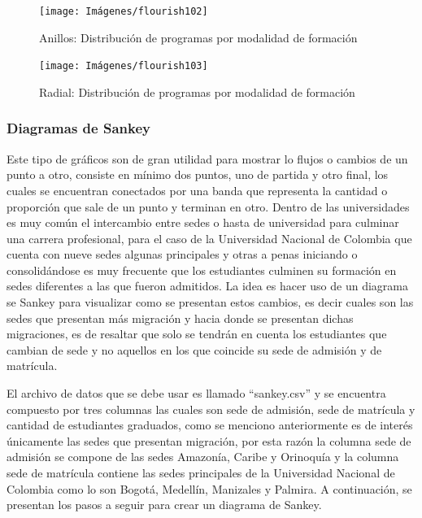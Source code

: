 \documentclass[
]{book}
\begin{document}
\begin{figure}

{\centering \texttt{[image: Imágenes/flourish102]} 

}

\caption{Anillos: Distribución de programas por modalidad de formación}\label{fig:anillosjerarquiaflourish-fig}
\end{figure}

\begin{figure}

{\centering \texttt{[image: Imágenes/flourish103]} 

}

\caption{Radial: Distribución de programas por modalidad de formación}\label{fig:radialjerarquiaflourish-fig}
\end{figure}

\hypertarget{diagramadesankeyflourish}{%
\subsubsection{Diagramas de Sankey}\label{diagramadesankeyflourish}}

Este tipo de gráficos son de gran utilidad para mostrar lo flujos o cambios de un punto a otro, consiste en mínimo dos puntos, uno de partida y otro final, los cuales se encuentran conectados por una banda que representa la cantidad o proporción que sale de un punto y terminan en otro. Dentro de las universidades es muy común el intercambio entre sedes o hasta de universidad para culminar una carrera profesional, para el caso de la Universidad Nacional de Colombia que cuenta con nueve sedes algunas principales y otras a penas iniciando o consolidándose es muy frecuente que los estudiantes culminen su formación en sedes diferentes a las que fueron admitidos. La idea es hacer uso de un diagrama se Sankey para visualizar como se presentan estos cambios, es decir cuales son las sedes que presentan más migración y hacia donde se presentan dichas migraciones, es de resaltar que solo se tendrán en cuenta los estudiantes que cambian de sede y no aquellos en los que coincide su sede de admisión y de matrícula.

El archivo de datos que se debe usar es llamado ``sankey.csv'' y se encuentra compuesto por tres columnas las cuales son sede de admisión, sede de matrícula y cantidad de estudiantes graduados, como se menciono anteriormente es de interés únicamente las sedes que presentan migración, por esta razón la columna sede de admisión se compone de las sedes Amazonía, Caribe y Orinoquía y la columna sede de matrícula contiene las sedes principales de la Universidad Nacional de Colombia como lo son Bogotá, Medellín, Manizales y Palmira. A continuación, se presentan los pasos a seguir para crear un diagrama de Sankey.
\end{document}
